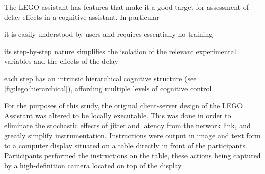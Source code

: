 \documentclass[10pt,letterpaper]{article}
\begin{document}
The LEGO assistant has features that make it a good target for assessment of delay effects in a cognitive assistant.
In particular
\begin{enumerate*}[itemjoin={{, }},
                  itemjoin*={{, and }},
                  label={{(\arabic*)}}]
    \item it is easily understood by users and requires essentially no training
    \item its step-by-step nature simplifies the isolation of the relevant experimental variables and the effects of the delay
    \item each step has an intrinsic hierarchical cognitive structure (see \cref{fig:lego:hierarchical}), affording multiple levels of cognitive control. 
\end{enumerate*}

\begin{figure*}[h]
  \centering
  \caption{Hierarchical cognitive structure of a step in the LEGO task.}
  \label{fig:lego:hierarchical}
\end{figure*}


For the purposes of this study, the original client-server design of the LEGO Assistant was altered to be locally executable.
This was done in order to eliminate the stochastic effects of jitter and latency from the network link, and greatly simplify instrumentation.
Instructions were output in image and text form to a computer display situated on a table directly in front of the participants.
Participants performed the instructions on the table, these actions being captured by a high-definition camera located on top of the display.

\end{document}
